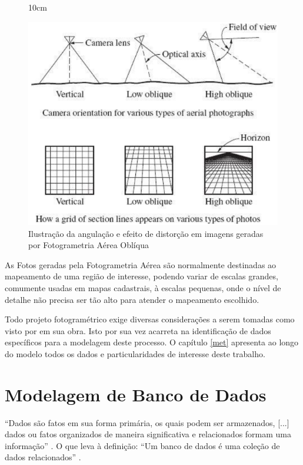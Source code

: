 \begin{figure}[!ht]{10cm}
  \caption{Ilustração da angulação e efeito de distorção em imagens geradas por Fotogrametria Aérea Oblíqua} \label{obliqua}
  \includegraphics[width=0.75\hsize]{figuras/obliqua.jpg}
\end{figure}

As Fotos geradas pela Fotogrametria Aérea são normalmente destinadas ao mapeamento de uma região de interesse, podendo variar de escalas grandes, comumente usadas em mapas cadastrais, à escalas pequenas, onde o nível de detalhe não precisa ser tão alto para atender o mapeamento escolhido.

Todo projeto fotogramétrico exige diversas considerações a serem tomadas como visto por  em sua obra. Isto por sua vez acarreta na identificação de dados específicos para a modelagem deste processo. O capítulo \ref{met} apresenta ao longo do modelo todos os dados e particularidades de interesse deste trabalho.

\section{Modelagem de Banco de Dados} \label{mod_bd}

``Dados são fatos em sua forma primária, os quais podem ser armazenados, [...] dados ou fatos organizados de maneira significativa e relacionados formam uma informação'' \cite[p.9]{barcelarbanco}. O que leva à definição: 
``Um banco de dados é uma coleção de dados relacionados''  \cite[p.3]{navathe2011fundamentals}.

